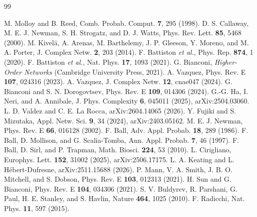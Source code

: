 \documentclass[aps,pre,twocolumn,superscriptaddress,floatfix,longbibliography]{revtex4-2}
\begin{document}
\begin{thebibliography}{99}

 M. Molloy and B. Reed,
  Comb. Probab. Comput. \textbf{7}, 295 (1998).
 D. S. Callaway, M. E. J. Newman, S. H. Strogatz, and
  D. J. Watts, Phys. Rev. Lett. \textbf{85}, 5468 (2000).
 M. Kivel\"a, A. Arenas, M. Barthelemy, J. P. Gleeson,
  Y. Moreno, and M. A. Porter, J. Complex Netw. \textbf{2}, 203 (2014).
 F. Battiston \textit{et al.},
  Phys. Rep. \textbf{874}, 1 (2020).
 F. Battiston \textit{et al.},
  Nat. Phys. \textbf{17}, 1093 (2021).
 G. Bianconi, \textit{Higher-Order Networks}
  (Cambridge University Press, 2021).
 A. Vazquez, Phys. Rev. E \textbf{107}, 024316 (2023).
 A. Vazquez, J. Complex Netw. \textbf{12}, cnae047
  (2024).
 G. Bianconi and S. N. Dorogovtsev,
  Phys. Rev. E \textbf{109}, 014306 (2024).
 G.-G. Ha, I. Neri, and A. Annibale,
  J. Phys. Complexity \textbf{6}, 045011 (2025), arXiv:2504.03060.
 L. D. Valdez and C. E. La Rocca,
  arXiv:2604.14065 (2026).
 Y. Fujiki and S. Mizutaka,
  Appl. Netw. Sci. \textbf{9}, 34 (2024), arXiv:2403.05162.
 M. E. J. Newman, Phys. Rev. E \textbf{66}, 016128 (2002).
 F. Ball, Adv. Appl. Probab. \textbf{18}, 289 (1986).
 F. Ball, D. Mollison, and G. Scalia-Tomba,
  Ann. Appl. Probab. \textbf{7}, 46 (1997).
 F. Ball, D. Sirl, and P. Trapman,
  Math. Biosci. \textbf{224}, 53 (2010).
 L. Cirigliano, Europhys. Lett. \textbf{152}, 31002
  (2025), arXiv:2506.17175.
 L. A. Keating and L. H\'ebert-Dufresne,
  arXiv:2511.15688 (2026).
 P. Mann, V. A. Smith, J. B. O. Mitchell, and S. Dobson,
  Phys. Rev. E \textbf{103}, 012313 (2021).
 H. Sun and G. Bianconi, Phys. Rev. E \textbf{104}, 034306
  (2021).
 S. V. Buldyrev, R. Parshani, G. Paul, H. E. Stanley, and
  S. Havlin, Nature \textbf{464}, 1025 (2010).
 F. Radicchi, Nat. Phys. \textbf{11}, 597 (2015).

\end{thebibliography}
\end{document}
